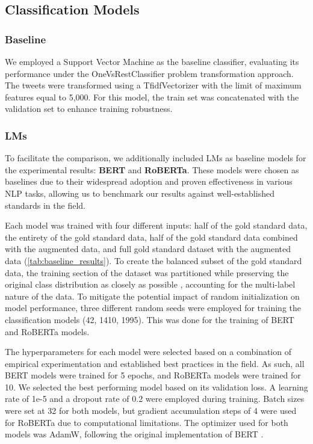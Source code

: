 \documentclass[manuscript]{clv3}
\begin{document}
\subsection{Classification Models}
\subsubsection{Baseline}
We employed a Support Vector Machine as the baseline classifier, evaluating its performance under the OneVsRestClassifier problem transformation approach. The tweets were transformed using a TfidfVectorizer with the limit of maximum features equal to 5,000. For this model, the train set was concatenated with the validation set to enhance training robustness.
\subsubsection{LMs}
To facilitate the comparison, we additionally included LMs as baseline models for the experimental results: \textbf{BERT} and \textbf{RoBERTa}. These models were chosen as baselines due to their widespread adoption and proven effectiveness in various NLP tasks, allowing us to benchmark our results against well-established standards in the field.

Each model was trained with four different inputs: half of the gold standard data, the entirety of the gold standard data, half of the gold standard data combined with the augmented data, and full gold standard dataset with the augmented data (\autoref{tab:baseline_results}). To create the balanced subset of the gold standard data, the training section of the dataset was partitioned while preserving the original class distribution as closely as possible \cite{10.1007/978-3-642-23808-6_10}, accounting for the multi-label nature of the data. To mitigate the potential impact of random initialization on model performance, three different random seeds were employed for training the classification models (42, 1410, 1995). This was done for the training of BERT and RoBERTa models.

The hyperparameters for each model were selected based on a combination of empirical experimentation and established best practices in the field. As such, all BERT models were trained for 5 epochs, and RoBERTa models were trained for 10. We selected the best performing model based on its validation loss. A learning rate of 1e-5 and a dropout rate of 0.2 were employed during training. Batch sizes were set at 32 for both models, but gradient accumulation steps of 4 were used for RoBERTa due to computational limitations. The optimizer used for both models was AdamW, following the original implementation of BERT \cite{DBLP:journals/corr/abs-1810-04805}.
\end{document}
